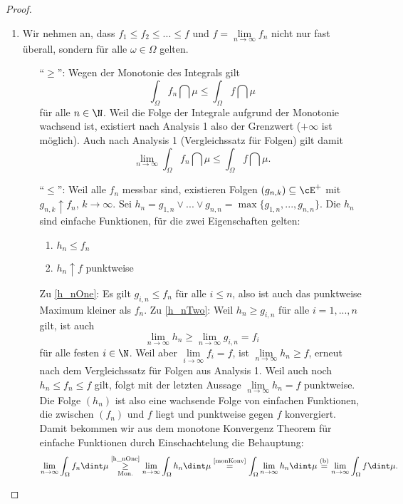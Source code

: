 \begin{proof}\abs
	\begin{enumerate}[label=(\roman*)]
		\item\label{allgMCTfastu} Wir nehmen an, dass $f_1 \leq f_2 \leq ... \leq f$ und $f = \lim\limits_{n \to \infty} f_n$ nicht nur fast überall, sondern für alle $\omega \in \Omega$ gelten.
		\begin{itemize}
			\item[\enquote{$\geq$}:] Wegen der Monotonie des Integrals gilt \[ \int_{\Omega} f_n \dint\mu \leq \int_{\Omega} f \dint\mu \] f\"ur alle $n\in\N$. Weil die Folge der Integrale aufgrund der Monotonie wachsend ist, existiert nach Analysis 1 also der Grenzwert ($+\infty$ ist m\"oglich). Auch nach Analysis 1 (Vergleichssatz f\"ur Folgen) gilt damit \[ \lim\limits_{n \to \infty} \int_{\Omega} f_n \dint\mu \leq \int_{\Omega} f \dint\mu. \]
			\item[\enquote{$\leq$}:] Weil alle $f_n$ messbar sind, existieren Folgen $(g_{n,k}) \subseteq \cE^+$ mit $g_{n,k} \uparrow f_n$, $ k\to \infty $. Sei $h_n = g_{1,n} \lor ... \lor g_{n,n} = \max \{ g_{1,n},...,g_{n,n} \} $. Die $h_n$ sind einfache Funktionen, für die zwei Eigenschaften gelten:
			\begin{enumerate}[label=(\alph*)]
				\item\label{h_nOne} $h_n \leq f_n$
				\item\label{h_nTwo} $h_n \uparrow f$ punktweise
			\end{enumerate}
			Zu \ref{h_nOne}: Es gilt $g_{i,n} \leq f_n$ für alle $i \leq n$, also ist auch das punktweise Maximum kleiner als $f_n$. Zu \ref{h_nTwo}: Weil $h_n \geq g_{i,n}$ f\"ur alle $i = 1,...,n$ gilt, ist auch $$\lim\limits_{n \to \infty} h_n \geq \lim\limits_{n \to \infty} g_{i,n} = f_i$$ f\"ur alle festen $i \in \N$. Weil aber $\lim\limits_{i \to \infty} f_i = f$, ist $\lim\limits_{n \to \infty} h_n \geq f$, erneut nach dem Vergleichssatz f\"ur Folgen aus Analysis 1. Weil auch noch $h_n \leq f_n \leq f$ gilt, folgt mit der letzten Aussage $\lim\limits_{n \to \infty} h_n = f$ punktweise. Die Folge $(h_n)$ ist also eine wachsende Folge von einfachen Funktionen, die zwischen $(f_n)$ und $f$ liegt und punktweise gegen $f$ konvergiert. Damit bekommen wir aus dem monotone Konvergenz Theorem f\"ur einfache Funktionen durch Einschachtelung die Behauptung: \[ \lim\limits_{n \to \infty} \int_{\Omega}  f_n \dint \mu \underset{\text{Mon.}}{\overset{\text{\ref{h_nOne}}}{\geq}} \lim\limits_{n \to \infty} \int_{\Omega}  h_n \dint \mu \overset{\text{\ref{monKonv}}}{=} \int_{\Omega} \lim\limits_{n \to \infty} h_n \dint \mu \overset{\text{(b)}}{=} \lim\limits_{n \to \infty} \int_{\Omega}  f \dint \mu. \]

\end{itemize}
\end{enumerate}
\end{proof}
